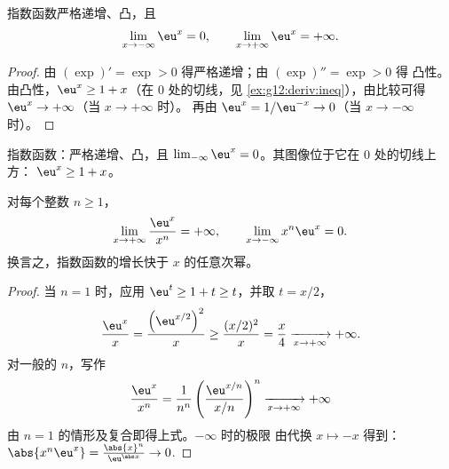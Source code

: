 \begin{proposition}[变化与极限]\label{prop:g12:exp:variations}
指数函数严格递增、凸，且
\[
\lim_{x\to-\infty} \eu^x = 0, \qquad
\lim_{x\to+\infty} \eu^x = +\infty .
\]
\end{proposition}

\begin{proof}
由 $(\exp)' = \exp > 0$ 得严格递增；由 $(\exp)'' = \exp > 0$ 得
凸性。由凸性，$\eu^x \geq 1 + x$（在 $0$ 处的切线，见
\cref{ex:g12:deriv:ineq}），由比较可得 $\eu^x \to +\infty$（当 $x \to +\infty$ 时）。
再由 $\eu^{x} = 1/\eu^{-x} \to 0$（当 $x \to -\infty$ 时）。
\end{proof}

\begin{omfigure}

{\small 指数函数：严格递增、凸，且
$\lim_{-\infty} \eu^x = 0$。其图像位于它在 $0$ 处的切线上方：
$\eu^x \geq 1 + x$。}
\end{omfigure}

\begin{theorem}[增长比较]\label{thm:g12:exp:growth}
对每个整数 $n \geq 1$，
\[
\lim_{x\to+\infty} \frac{\eu^x}{x^n} = +\infty,
\qquad
\lim_{x\to-\infty} x^n \eu^x = 0 .
\]
换言之，指数函数的增长快于 $x$ 的任意次幂。
\end{theorem}

\begin{proof}
当 $n = 1$ 时，应用 $\eu^t \geq 1 + t \geq t$，并取 $t = x/2$，
\[
\frac{\eu^x}{x} = \frac{\left(\eu^{x/2}\right)^2}{x}
\geq \frac{(x/2)^2}{x} = \frac{x}{4} \xrightarrow[x\to+\infty]{} +\infty .
\]
对一般的 $n$，写作
\[
\frac{\eu^x}{x^n}
= \frac{1}{n^n}\left(\frac{\eu^{x/n}}{x/n}\right)^{n}
\xrightarrow[x\to+\infty]{} +\infty
\]
由 $n=1$ 的情形及复合即得上式。$-\infty$ 时的极限
由代换 $x \mapsto -x$ 得到：
$\abs{x^n \eu^x} = \frac{\abs{x}^n}{\eu^{\abs x}} \to 0$.
\end{proof}

